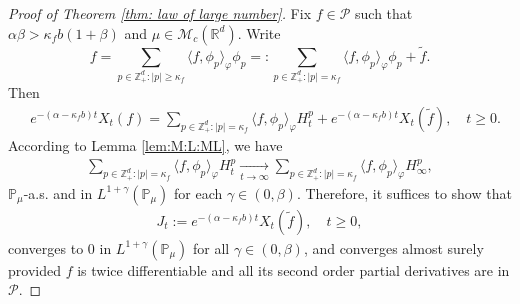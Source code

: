 \documentclass[EJP]{ejpecp} %
\begin{document}
\begin{proof}[Proof of Theorem \ref{thm: law of large number}]
	Fix $f \in \mathcal P$ such that $\alpha \beta > \kappa_f b (1+\beta)$ and $\mu \in \mathcal M_c(\mathbb R^d)$.
	Write
  \[
    f
    = \sum_{p\in \mathbb Z_+^d:|p|\geq \kappa_f}\langle f,\phi_p\rangle_\varphi \phi_p
    =: \sum_{p\in \mathbb Z_+^d:|p|= \kappa_f}\langle f,\phi_p\rangle_\varphi \phi_p+\widetilde{f}.
  \]
	Then
  \begin{align}
    & e^{-(\alpha-\kappa_fb)t}X_t(f)=
      \sum_{p\in \mathbb Z_+^d:|p|= \kappa_f}\langle f,\phi_p\rangle_\varphi H_t^p+e^{-(\alpha-\kappa_fb)t} X_t(\widetilde{f}),
      \quad t\geq 0.
  \end{align}
	According to Lemma \ref{lem:M:L:ML}, we have
  \begin{align}
    \label{as convergence}
    \sum_{p\in \mathbb{Z}_+^d:|p|= \kappa_f}\langle f,\phi_p\rangle_\varphi H_t^p
    \xrightarrow[t\to \infty]{} \sum_{p\in \mathbb{Z}_+^d:|p|=\kappa_f}\langle f, \phi_p\rangle_{\varphi} H_{\infty}^p,
  \end{align}
  $\mathbb{P}_{\mu}$-a.s. and in $L^{1+\gamma}(\mathbb{P}_{\mu})$ for each $\gamma\in(0,\beta)$.
  Therefore, it suffices to show that
  \begin{align}
    J_t
    :=e^{-(\alpha-\kappa_fb)t}X_t( \widetilde{f}),
    \quad t\geq 0,
  \end{align}
  converges to $0$ in $L^{1+\gamma}(\mathbb{P}_{\mu})$ for all $\gamma\in(0,\beta)$, and converges almost surely provided $f$ is twice differentiable and all its second order partial derivatives are in $\mathcal{P}$.


\end{proof}
\end{document}
